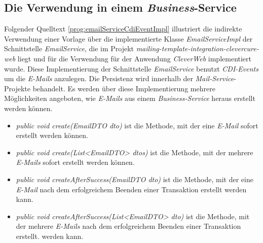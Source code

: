 \subsection{Die Verwendung in einem \emph{Business}-Service}
Folgender Quelltext \ref{prog:emailServiceCdiEventImpl} illustriert die indirekte Verwendung einer Vorlage über die implementierte Klasse \emph{EmailServiceImpl} der Schnittstelle \emph{EmailService}, die im Projekt \emph{mailing-template-integration-clevercure-web} liegt und für die Verwendung für der Anwendung \emph{CleverWeb} implementiert wurde. Diese Implementierung der Schnittstelle \emph{EmailService} benutzt \emph{CDI-Events} um die \emph{E-Mails} anzulegen. Die Persistenz wird innerhalb der \emph{Mail-Service}-Projekte behandelt. Es werden über diese Implementierung mehrere Möglichkeiten angeboten, wie \emph{E-Mails} aus einem \emph{Business-Service} heraus erstellt werden können.
\begin{itemize}
	\item\emph{public void create(EmailDTO dto)}
	\newline
	ist die Methode, mit der eine \emph{E-Mail} sofort erstellt werden können.
	\item\emph{public void create(List<EmailDTO> dtos)}
	\newline
	ist die Methode, mit der mehrere \emph{E-Mails} sofort erstellt werden können.
	\item\emph{public void createAfterSuccess(EmailDTO dto)}
	\newline
	ist die Methode, mit der eine \emph{E-Mail} nach dem erfolgreichem Beenden einer Transaktion erstellt werden kann.
	\item\emph{public void createAfterSuccess(List<EmailDTO> dto)}
	\newline
	ist die Methode, mit der mehrere \emph{E-Mails} nach dem erfolgreichem Beenden einer Transaktion erstellt.
 werden kann.    
\end{itemize} 
\ \newpage
